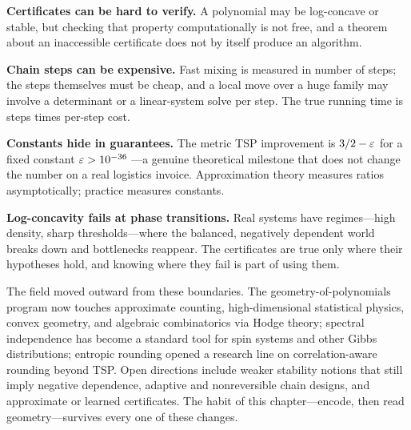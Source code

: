 \noindent\textbf{Certificates can be hard to verify.} A polynomial may be log-concave or stable, but checking that property computationally is not free, and a theorem about an inaccessible certificate does not by itself produce an algorithm.

\noindent\textbf{Chain steps can be expensive.} Fast mixing is measured in number of steps; the steps themselves must be cheap, and a local move over a huge family may involve a determinant or a linear-system solve per step. The true running time is steps times per-step cost.

\noindent\textbf{Constants hide in guarantees.} The metric TSP improvement is $3/2-\varepsilon$ for a fixed constant $\varepsilon>10^{-36}$ \cite{karlin-tsp}---a genuine theoretical milestone that does not change the number on a real logistics invoice. Approximation theory measures ratios asymptotically; practice measures constants.

\noindent\textbf{Log-concavity fails at phase transitions.} Real systems have regimes---high density, sharp thresholds---where the balanced, negatively dependent world breaks down and bottlenecks reappear. The certificates are true only where their hypotheses hold, and knowing where they fail is part of using them.

The field moved outward from these boundaries. The geometry-of-polynomials program now touches approximate counting, high-dimensional statistical physics, convex geometry, and algebraic combinatorics via Hodge theory; spectral independence has become a standard tool for spin systems and other Gibbs distributions; entropic rounding opened a research line on correlation-aware rounding beyond TSP. Open directions include weaker stability notions that still imply negative dependence, adaptive and nonreversible chain designs, and approximate or learned certificates. The habit of this chapter---encode, then read geometry---survives every one of these changes.

